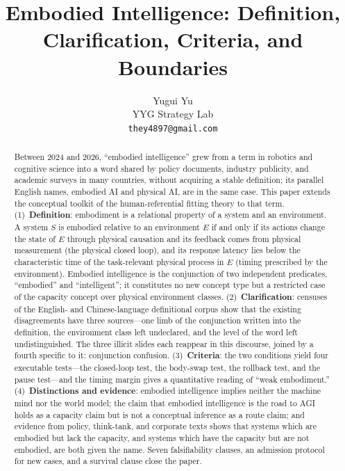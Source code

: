 \documentclass[10pt]{article}
\title{Embodied Intelligence: Definition, Clarification, Criteria, and Boundaries}
\author{Yugui Yu\\ YYG Strategy Lab\\ \texttt{they4897@gmail.com}}
\date{}
\begin{document}
\maketitle

\begin{abstract}
\noindent Between 2024 and 2026, ``embodied intelligence'' grew from a term in robotics and cognitive science into a word shared by policy documents, industry publicity, and academic surveys in many countries, without acquiring a stable definition; its parallel English names, embodied AI and physical AI, are in the same case. This paper extends the conceptual toolkit of the human-referential fitting theory to that term. (1)~\textbf{Definition}: embodiment is a relational property of a system and an environment. A system $S$ is embodied relative to an environment $E$ if and only if its actions change the state of $E$ through physical causation and its feedback comes from physical measurement (the physical closed loop), and its response latency lies below the characteristic time of the task-relevant physical process in $E$ (timing prescribed by the environment). Embodied intelligence is the conjunction of two independent predicates, ``embodied'' and ``intelligent''; it constitutes no new concept type but a restricted case of the capacity concept over physical environment classes. (2)~\textbf{Clarification}: censuses of the English- and Chinese-language definitional corpus show that the existing disagreements have three sources---one limb of the conjunction written into the definition, the environment class left undeclared, and the level of the word left undistinguished. The three illicit slides each reappear in this discourse, joined by a fourth specific to it: conjunction confusion. (3)~\textbf{Criteria}: the two conditions yield four executable tests---the closed-loop test, the body-swap test, the rollback test, and the pause test---and the timing margin gives a quantitative reading of ``weak embodiment.'' (4)~\textbf{Distinctions and evidence}: embodied intelligence implies neither the machine mind nor the world model; the claim that embodied intelligence is the road to AGI holds as a capacity claim but is not a conceptual inference as a route claim; and evidence from policy, think-tank, and corporate texts shows that systems which are embodied but lack the capacity, and systems which have the capacity but are not embodied, are both given the name. Seven falsifiability clauses, an admission protocol for new cases, and a survival clause close the paper.
\end{abstract}
\end{document}

